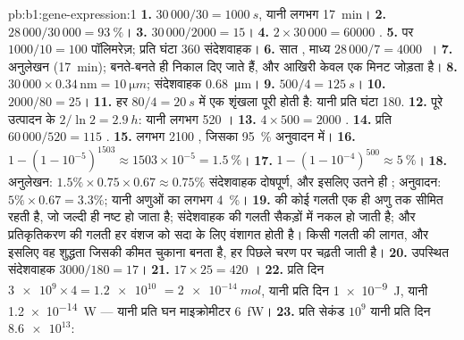 \begin{solution}{pb:b1:gene-expression:1}
\textbf{1.} $30\,000/30 = \qty{1000}{s}$, यानी लगभग \qty{17}{min}।
\textbf{2.} $28\,000/30\,000 = \qty{93}{\%}$।
\textbf{3.} $30\,000/2000 = 15$।
\textbf{4.} $2\times 30\,000 = \num{60000}$ .
\textbf{5.}  पर $1000/10 = 100$ पॉलिमरेज़; प्रति घंटा 360 संदेशवाहक।
\textbf{6.} सात , माध्य $28\,000/7 = \qty{4000}{}$ ।
\textbf{7.} अनुलेखन (\qty{17}{min});  बनते-बनते ही निकाल दिए
जाते हैं, और आखिरी केवल एक मिनट जोड़ता है।
\textbf{8.}  $30\,000\times 0.34\,\mathrm{nm} = \qty{10}{\micro m}$; संदेशवाहक \qty{0.68}{\micro m}।
\textbf{9.} $500/4 = \qty{125}{s}$।
\textbf{10.} $2000/80 = 25$।
\textbf{11.} हर $80/4 = \qty{20}{s}$ में एक शृंखला पूरी होती है: यानी
प्रति घंटा 180.
\textbf{12.} पूरे उत्पादन के $2/\ln 2 = \qty{2.9}{h}$: यानी लगभग 520
।
\textbf{13.} $4\times 500 = 2000$ .
\textbf{14.} प्रति  $60\,000/520 = 115$ .
\textbf{15.} लगभग 2100 , जिसका \qty{95}{\%} अनुवादन में।
\textbf{16.} $1 - (1 - 10^{-5})^{1503} \approx 1503\times 10^{-5} =
\qty{1.5}{\%}$।
\textbf{17.} $1 - (1 - 10^{-4})^{500} \approx \qty{5}{\%}$।
\textbf{18.} अनुलेखन: $1.5\%\times 0.75\times 0.67 \approx
0.75\%$ संदेशवाहक दोषपूर्ण, और इसलिए उतने ही ; अनुवादन:
$5\%\times 0.67 = 3.3\%$; यानी अणुओं का लगभग \qty{4}{\%}।
\textbf{19.}  की कोई गलती एक ही अणु तक सीमित रहती है, जो
जल्दी ही नष्ट हो जाता है; संदेशवाहक की गलती सैकड़ों  में नकल हो
जाती है; और प्रतिकृतिकरण की गलती हर वंशज को सदा के लिए वंशागत होती है।
किसी गलती की लागत, और इसलिए वह शुद्धता जिसकी कीमत चुकाना बनता है, हर
पिछले चरण पर चढ़ती जाती है।
\textbf{20.} उपस्थित संदेशवाहक $3000/180 = 17$।
\textbf{21.} $17\times 25 = 420$ ।
\textbf{22.} प्रति दिन $\num{3e9}\times 4 = \num{1.2e10}$ 
$= \qty{2e-14}{mol}$, यानी प्रति दिन \qty{1e-9}{J}, यानी \qty{1.2e-14}{W}
--- यानी प्रति घन माइक्रोमीटर \qty{6}{fW}।
\textbf{23.} प्रति सेकंड $10^9$  यानी प्रति दिन $\num{8.6e13}$:

\end{solution}
